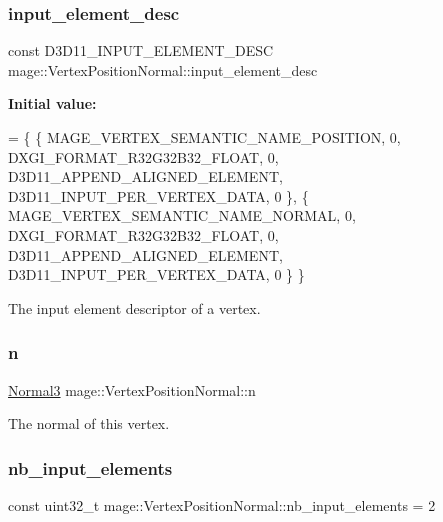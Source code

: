 \subsubsection{\texorpdfstring{input\+\_\+element\+\_\+desc}{input\_element\_desc}}
{\footnotesize\ttfamily const D3\+D11\+\_\+\+I\+N\+P\+U\+T\+\_\+\+E\+L\+E\+M\+E\+N\+T\+\_\+\+D\+E\+SC mage\+::\+Vertex\+Position\+Normal\+::input\+\_\+element\+\_\+desc\hspace{0.3cm}{\ttfamily [static]}}

{\bfseries Initial value\+:}
\begin{DoxyCode}
= \{
        \{ MAGE\_VERTEX\_SEMANTIC\_NAME\_POSITION, 0, DXGI\_FORMAT\_R32G32B32\_FLOAT,    0, 
      D3D11\_APPEND\_ALIGNED\_ELEMENT, D3D11\_INPUT\_PER\_VERTEX\_DATA, 0 \},
        \{ MAGE\_VERTEX\_SEMANTIC\_NAME\_NORMAL,   0, DXGI\_FORMAT\_R32G32B32\_FLOAT,    0, 
      D3D11\_APPEND\_ALIGNED\_ELEMENT, D3D11\_INPUT\_PER\_VERTEX\_DATA, 0 \}
    \}
\end{DoxyCode}
The input element descriptor of a vertex. \hypertarget{structmage_1_1_vertex_position_normal_a09baa618081e66e21cdfe5752dbf8df6}{}\label{structmage_1_1_vertex_position_normal_a09baa618081e66e21cdfe5752dbf8df6} 
\subsubsection{\texorpdfstring{n}{n}}
{\footnotesize\ttfamily \hyperlink{structmage_1_1_normal3}{Normal3} mage\+::\+Vertex\+Position\+Normal\+::n}

The normal of this vertex. \hypertarget{structmage_1_1_vertex_position_normal_a7ccf8843b44100cfdd8ad9bc30228f94}{}\label{structmage_1_1_vertex_position_normal_a7ccf8843b44100cfdd8ad9bc30228f94} 
\subsubsection{\texorpdfstring{nb\+\_\+input\+\_\+elements}{nb\_input\_elements}}
{\footnotesize\ttfamily const uint32\+\_\+t mage\+::\+Vertex\+Position\+Normal\+::nb\+\_\+input\+\_\+elements = 2\hspace{0.3cm}{\ttfamily [static]}}


